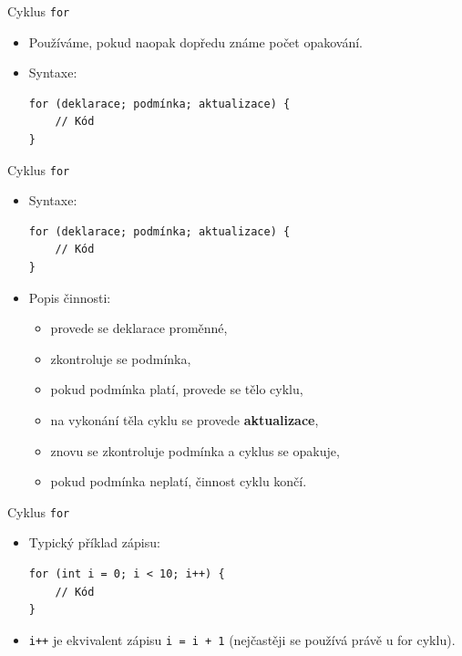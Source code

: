 \documentclass[14pt,aspectratio=169]{beamer}
\begin{document}
    \begin{frame}[t,fragile]{Cyklus \texttt{for}}
        \begin{itemize}
            \item Používáme, pokud naopak dopředu známe počet opakování.
            \item Syntaxe:
            \begin{lstlisting}
for (deklarace; podmínka; aktualizace) {
    // Kód
}
            \end{lstlisting}
        \end{itemize}
    \end{frame}

    \begin{frame}[t,fragile]{Cyklus \texttt{for}}
        \begin{itemize}
            \item Syntaxe:
            \begin{lstlisting}
for (deklarace; podmínka; aktualizace) {
    // Kód
}
            \end{lstlisting}
            \item Popis činnosti:
            \begin{itemize}
                \item provede se deklarace proměnné,
                \item zkontroluje se podmínka,
                \item pokud podmínka platí, provede se tělo cyklu,
                \item na vykonání těla cyklu se provede \textbf{aktualizace},
                \item znovu se zkontroluje podmínka a cyklus se opakuje,
                \item pokud podmínka neplatí, činnost cyklu končí.
            \end{itemize}
        \end{itemize}
    \end{frame}

    \begin{frame}[t,fragile]{Cyklus \texttt{for}}
        \begin{itemize}
            \item Typický příklad zápisu:
            \begin{lstlisting}
for (int i = 0; i < 10; i++) {
    // Kód
}
            \end{lstlisting}
            \item \texttt{i++} je ekvivalent zápisu \texttt{i = i + 1} (nejčastěji se používá právě u
            for cyklu).
        \end{itemize}
    \end{frame}
\end{document}
